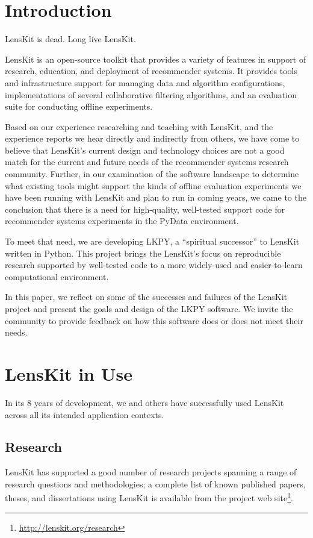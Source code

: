 \section{Introduction}

LensKit is dead. Long live LensKit.

LensKit \citep{Ekstrand2011-bp} is an open-source toolkit that provides a variety of features in support of research, education, and deployment of recommender systems.
It provides tools and infrastructure support for managing data and algorithm configurations, implementations of several collaborative filtering algorithms, and an evaluation suite for conducting offline experiments.

Based on our experience researching and teaching with LensKit, and the experience reports we hear directly and indirectly from others, we have come to believe that LensKit's current design and technology choices are not a good match for the current and future needs of the recommender systems research community.
Further, in our examination of the software landscape to determine what existing tools might support the kinds of offline evaluation experiments we have been running with LensKit and plan to run in coming years, we came to the conclusion that there is a need for high-quality, well-tested support code for recommender systems experiments in the PyData environment.

To meet that need, we are developing LKPY, a ``spiritual successor'' to LensKit written in Python.
This project brings the LensKit's focus on reproducible research supported by well-tested code to a more widely-used and easier-to-learn computational environment.

In this paper, we reflect on some of the successes and failures of the LensKit project and present the goals and design of the LKPY software.
We invite the community to provide feedback on how this software does or does not meet their needs.

\section{LensKit in Use}

In its 8 years of development, we and others have successfully used LensKit across all its intended application contexts.

\subsection{Research}
LensKit has supported a good number of research projects spanning a range of research questions and methodologies; a complete list of known published papers, theses, and dissertations using LensKit is available from the project web site\footnote{\url{http://lenskit.org/research}}.

